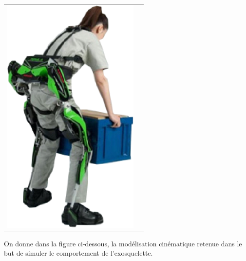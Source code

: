 \documentclass[10pt,fleqn]{article} %
\begin{document}
\begin{multicols}{2}
\begin{tabular}{m{.6\linewidth}m{.3\linewidth}}
\includegraphics[width=\linewidth]{images/fig_02}

\end{tabular}



\begin{center}
\end{center}

On donne dans la figure ci-dessous, la modélisation cinématique retenue dans le but de simuler le comportement de l'exosquelette.



\end{multicols}
\end{document}

